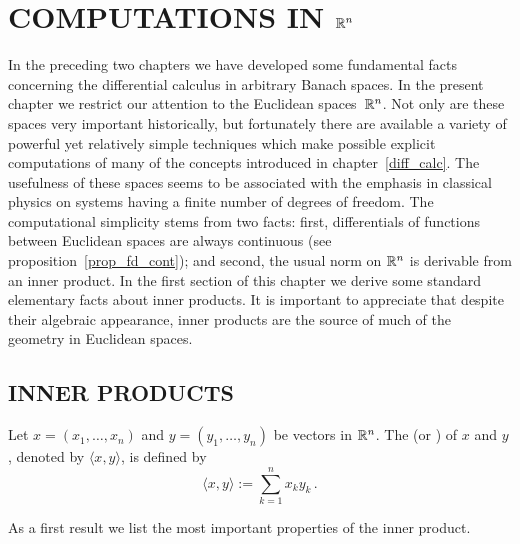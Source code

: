 \chapter{COMPUTATIONS IN $\mathbb{R}^n$}\label{comp_Rn}

In the preceding two chapters we have developed some fundamental facts concerning the
differential calculus in arbitrary Banach spaces. In the present chapter we restrict our
attention to the Euclidean spaces~$\mathbb{R}^n$.  Not only are these spaces very important
historically, but fortunately there are available a variety of powerful yet relatively simple
techniques which make possible explicit computations of many of the concepts introduced in
chapter~\ref{diff_calc}.  The usefulness of these spaces seems to be associated with the
emphasis in classical physics on systems having a finite number of degrees of freedom. The
computational simplicity stems from two facts: first, differentials of functions between
Euclidean spaces are always continuous (see proposition~\ref{prop_fd_cont}); and second, the
usual norm on $\mathbb{R}^n$ is derivable from an inner product. In the first section of this chapter
we derive some standard elementary facts about inner products.  It is important to appreciate
that despite their algebraic appearance, inner products are the source of much of the geometry
in Euclidean spaces.

\section{INNER PRODUCTS}
\begin{defn}  Let $x = (x_1, \dots, x_n)$ and $y = (y_1, \dots,y_n)$ be vectors in $\mathbb{R}^n$.  The
 (or
) of $x$ and $y$, denoted by $\langle x,y \rangle$,
is defined by
  \[ \langle x,y \rangle := \sum_{k=1}^n x_ky_k\,. \]
\end{defn}

As a first result we list the most important properties of the inner product.

